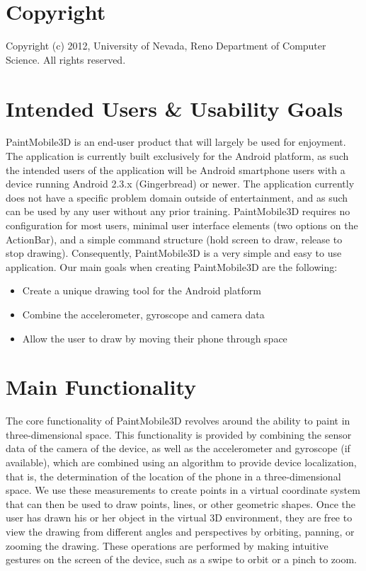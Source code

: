 \documentclass{chi-ext}
\begin{document}
\pagebreak

\section{Copyright}
Copyright (c) 2012, University of Nevada, Reno Department of Computer Science.
All rights reserved.

\section{Intended Users \& Usability Goals}

PaintMobile3D is an end-user product that will largely be used for enjoyment. The application is currently built exclusively for the Android platform, as such the intended users of the application will be Android smartphone users with a device running Android 2.3.x (Gingerbread) or newer. The application currently does not have a specific problem domain outside of entertainment, and as such can be used by any user without any prior training. PaintMobile3D requires no configuration for most users, minimal user interface elements (two options on the ActionBar), and a simple command structure (hold screen to draw, release to stop drawing). Consequently, PaintMobile3D is a very simple and easy to use application. Our main goals when creating PaintMobile3D are the following:

\begin{itemize}
\item
Create a unique drawing tool for the Android platform
\item
Combine the accelerometer, gyroscope and camera data
\item
Allow the user to draw by moving their phone through space
\end{itemize}

\section{Main Functionality}

The core functionality of PaintMobile3D revolves around the ability to paint in three-dimensional space. This functionality is provided by combining the sensor data of the camera of the device, as well as the accelerometer and gyroscope (if available), which are combined using an algorithm to provide device localization, that is, the determination of the location of the phone in a three-dimensional space. We use these measurements to create points in a virtual coordinate system that can then be used to draw points, lines, or other geometric shapes. Once the user has drawn his or her object in the virtual 3D environment, they are free to view the drawing from different angles and perspectives by orbiting, panning, or zooming the drawing. These operations are performed by making intuitive gestures on the screen of the device, such as a swipe to orbit or a pinch to zoom.
\end{document}
